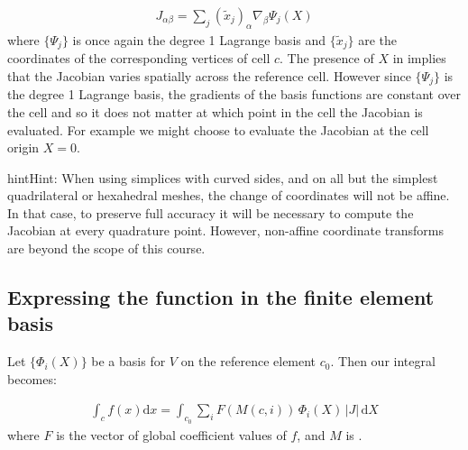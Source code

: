 \documentclass{book}
\begin{document}
\label{\detokenize{5_functions:equation-jacobian}}\begin{equation}\label{equation:5_functions:jacobian}
\begin{split}J_{\alpha\beta} = \sum_j (\tilde{x}_j)_\alpha \nabla_\beta\Psi_j(X)\end{split}
\end{equation}
where \(\{\Psi_j\}\) is once again the degree 1 Lagrange basis and
\(\{\tilde{x}_j\}\) are the coordinates of the corresponding vertices of
cell \(c\). The presence of \(X\) in {\hyperref[\detokenize{5_functions:equation-jacobian}]{}} implies that the
Jacobian varies spatially across the reference cell. However since
\(\{\Psi_j\}\) is the degree 1 Lagrange basis, the gradients of the
basis functions are constant over the cell and so it does not matter
at which point in the cell the Jacobian is evaluated. For example we
might choose to evaluate the Jacobian at the cell origin \(X=0\).

\begin{sphinxadmonition}{hint}{Hint:}
When using simplices with curved sides, and on all but the simplest
quadrilateral or hexahedral meshes, the change of coordinates
will not be affine. In that case, to preserve full accuracy it will be
necessary to compute the Jacobian at every quadrature
point. However, non-affine coordinate transforms are beyond the
scope of this course.
\end{sphinxadmonition}


\subsection{Expressing the function in the finite element basis}
\label{\detokenize{5_functions:expressing-the-function-in-the-finite-element-basis}}
Let \(\{\Phi_i(X)\}\) be a  basis for \(V\) on the reference element
\(c_0\). Then our integral becomes:

\label{\detokenize{5_functions:equation-5_functions:5}}\begin{equation}\label{equation:5_functions:5_functions:5}
\begin{split}\int_c f(x)\mathrm{d}x  = \int_{c_0} \sum_i F(M(c,i))\,\Phi_i(X)\, |J|\,\mathrm{d} X\end{split}
\end{equation}
where \(F\) is the vector of global coefficient values of \(f\), and \(M\) is {\hyperref[\detokenize{4_function_spaces:cell-node}]{}}.
\end{document}
